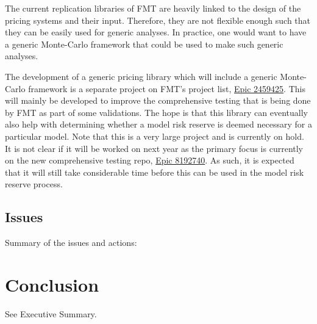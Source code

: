 \documentclass[reviewdoc]{pmv_report} %
\begin{document}
The current replication libraries of FMT are heavily linked to the design of the pricing systems and their input.
Therefore, they are not flexible enough such that they can be easily used for generic analyses.
In practice, one would want to have a generic Monte-Carlo framework that could be used to make such generic analyses.

The development of a generic pricing library which will include a generic Monte-Carlo framework is a separate project on FMT's project list, \href{https://dev.azure.com/raboweb/PMVProjectList/_workitems/edit/2459425/}{Epic 2459425}.
This will mainly be developed to improve the comprehensive testing that is being done by FMT as part of some validations.
The hope is that this library can eventually also help with determining whether a model risk reserve is deemed necessary for a particular model.
Note that this is a very large project and is currently on hold.
It is not clear if it will be worked on next year as the primary focus is currently on the new comprehensive testing repo, \href{https://dev.azure.com/raboweb/PMVProjectList/_workitems/edit/8192740}{Epic 8192740}.
As such, it is expected that it will still take considerable time before this can be used in the model risk reserve process.

\subsection{Issues}
\label{sec:otherTopicsIssues}
Summary of the issues and actions:
\begin{itemize}
  \issueactionIV
\end{itemize}

\section{Conclusion}\label{sec:conclusions}
See Executive Summary.

\newpage


\newpage
\end{document}
